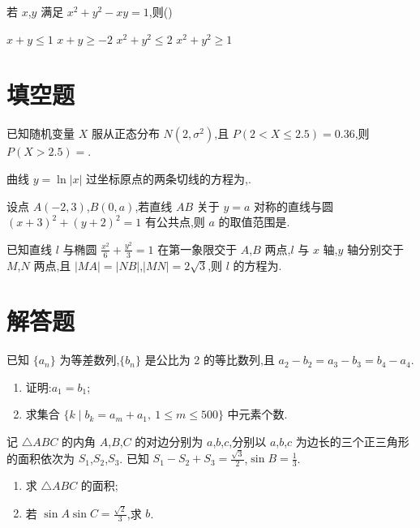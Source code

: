 \begin{problem}
若 \(x\),\(y\) 满足 \(x^2+y^2-xy=1\),则(\quad)

\choices
    {\(x+y\le 1\)}
    {\(x+y\ge -2\)}
    {\(x^2+y^2\le 2\)}
    {\(x^2+y^2\ge 1\)}
\end{problem}

\section{填空题}

\begin{problem}
已知随机变量 \(X\) 服从正态分布 \(N(2,\sigma^2)\),且 \(P(2<X\le 2.5)=0.36\),则 \(P(X>2.5)=\)\fillinblank{}.
\end{problem}

\begin{problem}
曲线 \(y=\ln|x|\) 过坐标原点的两条切线的方程为\fillinblank{},\fillinblank{}.
\end{problem}

\begin{problem}
设点 \(A(-2,3)\),\(B(0,a)\),若直线 \(AB\) 关于 \(y=a\) 对称的直线与圆 \((x+3)^2+(y+2)^2=1\) 有公共点,则 \(a\) 的取值范围是\fillinblank{}.
\end{problem}

\begin{problem}
已知直线 \(l\) 与椭圆 \(\frac{x^2}{6}+\frac{y^2}{3}=1\) 在第一象限交于 \(A\),\(B\) 两点,\(l\) 与 \(x\) 轴,\(y\) 轴分别交于 \(M\),\(N\) 两点,且 \(|MA|=|NB|\),\(|MN|=2\sqrt3\),则 \(l\) 的方程为\fillinblank{}.
\end{problem}

\section{解答题}

\begin{problem}
已知 \(\{a_n\}\) 为等差数列,\(\{b_n\}\) 是公比为 2 的等比数列,且 \(a_2-b_2=a_3-b_3=b_4-a_4\).
\begin{enumerate}
\item 证明:\(a_1=b_1\);
\item 求集合 \(\{k\mid b_k=a_m+a_1,\ 1\le m\le 500\}\) 中元素个数.
\end{enumerate}
\end{problem}

\begin{problem}
记 \(\triangle ABC\) 的内角 \(A\),\(B\),\(C\) 的对边分别为 \(a\),\(b\),\(c\),分别以 \(a\),\(b\),\(c\) 为边长的三个正三角形的面积依次为 \(S_1\),\(S_2\),\(S_3\). 已知 \(S_1-S_2+S_3=\frac{\sqrt3}{2}\),\(\sin B=\frac13\).
\begin{enumerate}
\item 求 \(\triangle ABC\) 的面积;
\item 若 \(\sin A\sin C=\frac{\sqrt2}{3}\),求 \(b\).
\end{enumerate}
\end{problem}

